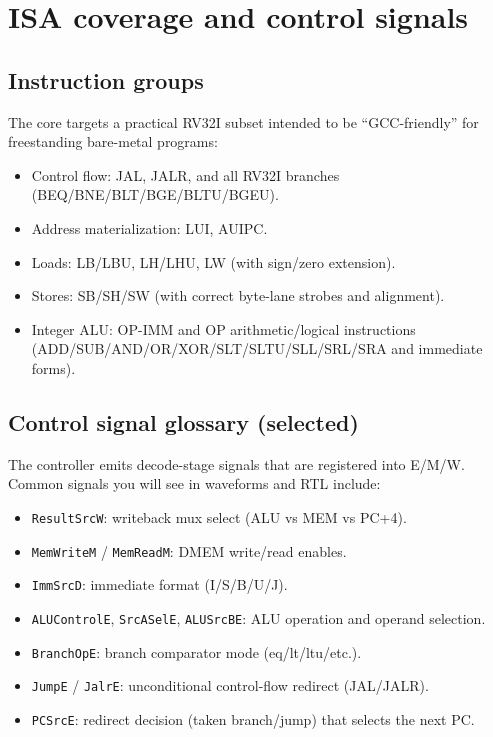 \section{ISA coverage and control signals}

\subsection{Instruction groups}
The core targets a practical RV32I subset intended to be ``GCC-friendly'' for
freestanding bare-metal programs:
\begin{itemize}[leftmargin=*]
  \item Control flow: JAL, JALR, and all RV32I branches (BEQ/BNE/BLT/BGE/BLTU/BGEU).
  \item Address materialization: LUI, AUIPC.
  \item Loads: LB/LBU, LH/LHU, LW (with sign/zero extension).
  \item Stores: SB/SH/SW (with correct byte-lane strobes and alignment).
  \item Integer ALU: OP-IMM and OP arithmetic/logical instructions (ADD/SUB/AND/OR/XOR/SLT/SLTU/SLL/SRL/SRA and immediate forms).
\end{itemize}

\subsection{Control signal glossary (selected)}
The controller emits decode-stage signals that are registered into E/M/W.
Common signals you will see in waveforms and RTL include:
\begin{itemize}[leftmargin=*]
  \item \texttt{ResultSrcW}: writeback mux select (ALU vs MEM vs PC+4).
  \item \texttt{MemWriteM} / \texttt{MemReadM}: DMEM write/read enables.
  \item \texttt{ImmSrcD}: immediate format (I/S/B/U/J).
  \item \texttt{ALUControlE}, \texttt{SrcASelE}, \texttt{ALUSrcBE}: ALU operation and operand selection.
  \item \texttt{BranchOpE}: branch comparator mode (eq/lt/ltu/etc.).
  \item \texttt{JumpE} / \texttt{JalrE}: unconditional control-flow redirect (JAL/JALR).
  \item \texttt{PCSrcE}: redirect decision (taken branch/jump) that selects the next PC.
\end{itemize}

